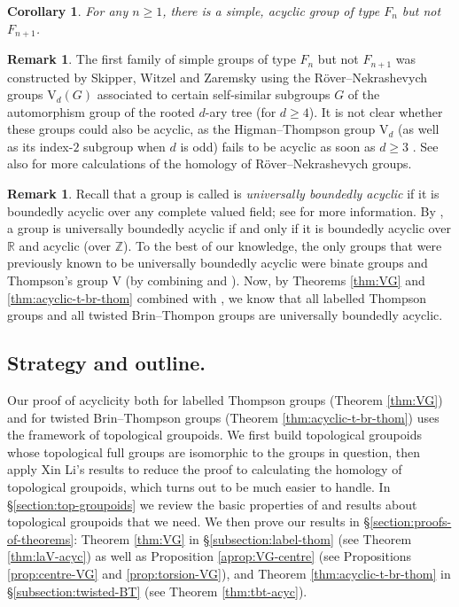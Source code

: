 \documentclass[10pt,a4paper]{amsart}
\numberwithin{equation}{section}
\numberwithin{figure}{section}
\newtheorem{cor}[thm]{Corollary}
\theoremstyle{definition}
\newtheorem{rem}[thm]{Remark}
\newcommand{\V}{\mathrm{V}}
\renewcommand{\geq}{\geqslant}
\begin{document}
\begin{cor}\label{cor:acyc-Fn-nFn+1-simple}
For any $n\geq 1$, there is a simple, acyclic group of type $F_n$ but not $F_{n+1}$.
\end{cor}

\begin{rem}
The first family of simple groups of type $F_n$ but not $F_{n+1}$ was constructed by Skipper, Witzel and Zaremsky \cite[Theorem 7.1]{SkipperWitzelZaremsky19} using the R\"over--Nekrashevych groups $\V_d(G)$ associated to certain self-similar subgroups $G$ of the automorphism group of the rooted $d$-ary tree (for $d \geq 4$). It is not clear whether these groups could also be acyclic, as the Higman--Thompson group $\V_d$ (as well as its index-$2$ subgroup when $d$ is odd) fails to be acyclic as soon as $d\geq 3$ \cite[\S 6]{SW19}. See also \cite{MillerSteinberg24} for more calculations of the homology of Röver--Nekrashevych groups.
\end{rem}

\begin{rem}
Recall that a group is called is \emph{universally boundedly acyclic} if it is boundedly acyclic over any complete valued field; see \cite[\S 5]{FFLM23} for more information. By \cite[Theorem 5.2]{FFLM23}, a group is universally boundedly acyclic if and only if it is boundedly acyclic over $\mathbb{R}$ and acyclic (over $\mathbb{Z}$). To the best of our knowledge, the only groups that were previously known to be universally boundedly acyclic were binate groups \cite[Theorem 1.4]{FFLM23} and Thompson's group $\V$ (by combining \cite{Konstantin22} and \cite{SW19}). Now, by Theorems \ref{thm:VG} and \ref{thm:acyclic-t-br-thom} combined with \cite[Theorems 0.1 and 0.11]{WuWuZhaoZhou2025}, we know that all labelled Thompson groups and all twisted Brin--Thompon groups are universally boundedly acyclic.
\end{rem}


\subsection*{Strategy and outline.}

Our proof of acyclicity both for labelled Thompson groups (Theorem \ref{thm:VG}) and for twisted Brin--Thompson groups (Theorem \ref{thm:acyclic-t-br-thom}) uses the framework of topological groupoids. We first build topological groupoids whose topological full groups are isomorphic to the groups in question, then apply Xin Li's results \cite{Li2024} to reduce the proof to calculating the homology of topological groupoids, which turns out to be much easier to handle. In \S\ref{section:top-groupoids} we review the basic properties of and results about topological groupoids that we need. We then prove our results in \S\ref{section:proofs-of-theorems}: Theorem \ref{thm:VG} in \S\ref{subsection:label-thom} (see Theorem \ref{thm:laV-acyc}) as well as Proposition \ref{aprop:VG-centre} (see Propositions \ref{prop:centre-VG} and \ref{prop:torsion-VG}), and Theorem \ref{thm:acyclic-t-br-thom} in \S\ref{subsection:twisted-BT} (see Theorem \ref{thm:tbt-acyc}).
\end{document}

